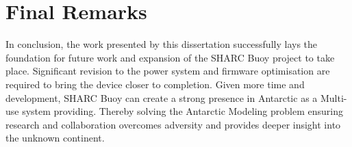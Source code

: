 \pagebreak
\section{Final Remarks}
In conclusion, the work presented by this dissertation successfully lays the foundation for future work and expansion of the SHARC Buoy project to take place. Significant revision to the power system and firmware optimisation are required to bring the device closer to completion. Given more time and development, SHARC Buoy can create a strong presence in Antarctic as a Multi-use system providing. Thereby solving the Antarctic Modeling problem ensuring research and collaboration overcomes adversity and provides deeper insight into the unknown continent.
